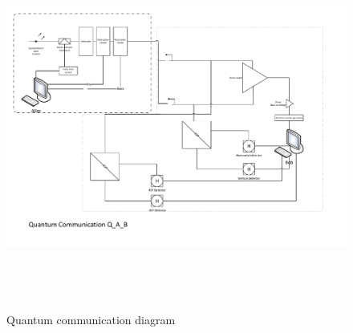 \begin{figure}[H]
	\centering \includegraphics[width=1.2\textwidth,height=12cm]{./sdf/ot_with_discrete_variables/figures/OT_experimental_setup.pdf}
	\caption{Quantum communication diagram}\label{quantumchannelcommunication}
\end{figure}